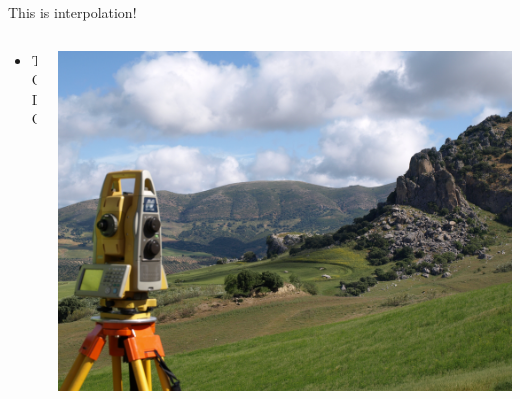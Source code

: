 \begin{frame}{This is interpolation!}
	\begin{columns}[T] %
		\begin{column}{.56\textwidth}
			\begin{itemize}
				\item TODO
			\end{itemize}
		\end{column}%
		\hfill%
		\begin{column}{.48\textwidth}
			\includegraphics[width=\linewidth]{images/background}
		\end{column}%
	\end{columns}
\end{frame}